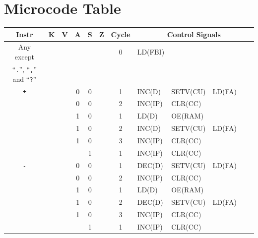 \chapter{Microcode Table} \label{sec:appendix:microcode}

\begin{footnotesize}
  \begin{longtable}[c] {c|ccccc|c|lllll}
     Instr          & K & V & A & S     & Z    & Cycle & \multicolumn{5}{c}{Control Signals}                      \\ \hline
    \rowcolor{White} Any except   &   &   &       &      &      & 0   & LD(FBI)         &               &        &                \\
    \rowcolor{White} ``\texttt{.}'', ``\texttt{,}'' and ``\texttt{?}'' &   &   &       &      &      &   &           &          &        &         \\ \hline
    \rowcolor{Gray}  \texttt{+}   &   &   & 0 & 0     &      & 1     & INC(D)   & SETV(CU) & LD(FA)  &        &                \\
    \rowcolor{Gray}               &   &   & 0 & 0     &      & 2     & INC(IP)  & CLR(CC)   &         &        &                \\    
    \rowcolor{White}              &   &   & 1 & 0     &      & 1     & LD(D)    & OE(RAM)  &         &        &                \\
    \rowcolor{White}              &   &   & 1 & 0     &      & 2     & INC(D)   & SETV(CU) & LD(FA)  &        &                \\
    \rowcolor{White}              &   &   & 1 & 0     &      & 3     & INC(IP)  & CLR(CC)   &         &        &                \\
    \rowcolor{Gray}               &   &   &   & 1     &      & 1     & INC(IP)  & CLR(CC)   &         &        &                \\ \hline
    
    \rowcolor{Gray}  \texttt{-}   &   &   & 0 & 0     &      & 1     & DEC(D)   & SETV(CU) & LD(FA)  &        &                \\
    \rowcolor{Gray}               &   &   & 0 & 0     &      & 2     & INC(IP)  & CLR(CC)   &         &        &                \\    
    \rowcolor{White}              &   &   & 1 & 0     &      & 1     & LD(D)    & OE(RAM)  &         &        &                \\
    \rowcolor{White}              &   &   & 1 & 0     &      & 2     & DEC(D)   & SETV(CU) & LD(FA)  &        &                \\
    \rowcolor{White}              &   &   & 1 & 0     &      & 3     & INC(IP)  & CLR(CC)   &         &        &                \\
    \rowcolor{Gray}               &   &   &   & 1     &      & 1     & INC(IP)  & CLR(CC)   &         &        &                \\ \hline


\end{longtable}
\end{footnotesize}
